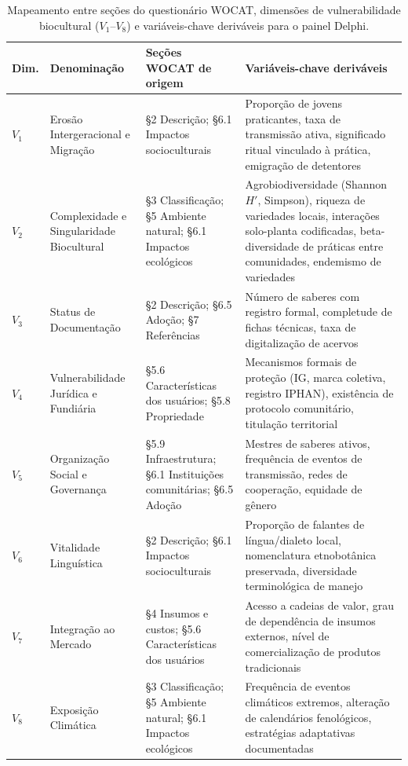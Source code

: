 \documentclass[3p,times]{elsarticle}
\begin{document}
\begin{table}[htbp]
\centering
\caption{Mapeamento entre seções do questionário WOCAT, dimensões de vulnerabilidade biocultural ($V_1$--$V_8$) e variáveis-chave deriváveis para o painel Delphi.}
\label{tab:wocat_delphi}
\small
\begin{tabular}{p{0.8cm}p{2.2cm}p{3.5cm}p{4.5cm}}
\toprule
\textbf{Dim.} & \textbf{Denominação} & \textbf{Seções WOCAT de origem} & \textbf{Variáveis-chave deriváveis} \\
\midrule
$V_1$ & Erosão Intergeracional e Migração & \S2 Descrição; \S6.1 Impactos socioculturais & Proporção de jovens praticantes, taxa de transmissão ativa, significado ritual vinculado à prática, emigração de detentores \citep{ReyesGarcia2013evidence,TangGavin2016} \\
\addlinespace
$V_2$ & Complexidade e Singularidade Biocultural & \S3 Classificação; \S5 Ambiente natural; \S6.1 Impactos ecológicos & Agrobiodiversidade (Shannon $H'$, Simpson), riqueza de variedades locais, interações solo-planta codificadas, beta-diversidade de práticas entre comunidades, endemismo de variedades \citep{Maffi2001,FernandezLlamazares2021,Zimmerer2018} \\
\addlinespace
$V_3$ & Status de Documentação & \S2 Descrição; \S6.5 Adoção; \S7 Referências & Número de saberes com registro formal, completude de fichas técnicas, taxa de digitalização de acervos \citep{Maina2012,Balogun2021} \\
\addlinespace
$V_4$ & Vulnerabilidade Jurídica e Fundiária & \S5.6 Características dos usuários; \S5.8 Propriedade & Mecanismos formais de proteção (IG, marca coletiva, registro IPHAN), existência de protocolo comunitário, titulação territorial \citep{Dutfield2004,BavikatteRobinson2011} \\
\addlinespace
$V_5$ & Organização Social e Governança & \S5.9 Infraestrutura; \S6.1 Instituições comunitárias; \S6.5 Adoção & Mestres de saberes ativos, frequência de eventos de transmissão, redes de cooperação, equidade de gênero \citep{Berkes2004,OlssonFolkeBerkes2004} \\
\addlinespace
$V_6$ & Vitalidade Linguística & \S2 Descrição; \S6.1 Impactos socioculturais & Proporção de falantes de língua/dialeto local, nomenclatura etnobotânica preservada, diversidade terminológica de manejo \citep{CamaraLeret2021,Maffi2001} \\
\addlinespace
$V_7$ & Integração ao Mercado & \S4 Insumos e custos; \S5.6 Características dos usuários & Acesso a cadeias de valor, grau de dependência de insumos externos, nível de comercialização de produtos tradicionais \citep{Belletti2015,Zimmerer2018} \\
\addlinespace
$V_8$ & Exposição Climática & \S3 Classificação; \S5 Ambiente natural; \S6.1 Impactos ecológicos & Frequência de eventos climáticos extremos, alteração de calendários fenológicos, estratégias adaptativas documentadas \citep{FernandezLlamazares2021,TangGavin2016} \\
\bottomrule
\end{tabular}
\end{table}
\end{document}
